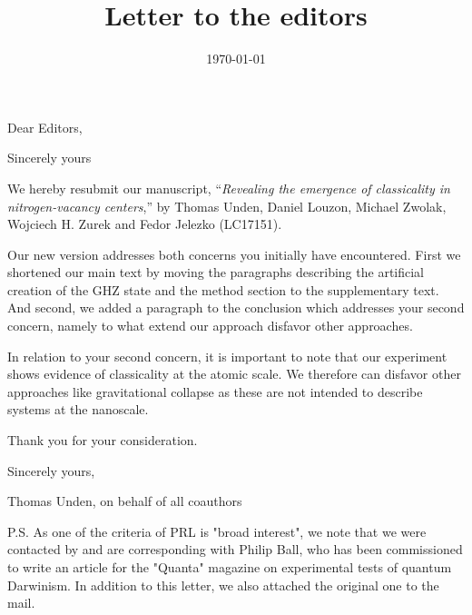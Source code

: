 \documentclass[10pt,a4paper,roman]{moderncv}        %
\title{Letter to the editors}                               %
\begin{document}
\date{\today}
\opening{Dear Editors,}
\closing{Sincerely yours}
\makelettertitle

\justify
We hereby resubmit our manuscript, ``\emph{Revealing the emergence of classicality in nitrogen-vacancy centers},'' by Thomas Unden, Daniel Louzon, Michael Zwolak, Wojciech H. Zurek and Fedor Jelezko (LC17151).

Our new version addresses both concerns you initially have encountered. First we shortened our main text by moving the paragraphs describing the artificial creation of the GHZ state and the method section to the supplementary text. And second, we added a paragraph to the conclusion which addresses your second concern, namely to what extend our approach disfavor other approaches.

In relation to your second concern, it is important to note that our experiment shows evidence of 
classicality at the atomic scale. We therefore can disfavor other approaches like gravitational collapse as these are not intended to describe systems at the nanoscale.

Thank you for your consideration. 
\bigskip

Sincerely yours,\bigskip

Thomas Unden, on behalf of all coauthors

P.S. As one of the criteria of PRL is "broad interest", we note that we were contacted by and are corresponding with Philip Ball, who has been commissioned to write an article for the "Quanta" magazine on experimental tests of quantum Darwinism. In addition to this letter, we also attached the original one to the mail.
	 
\end{document}
